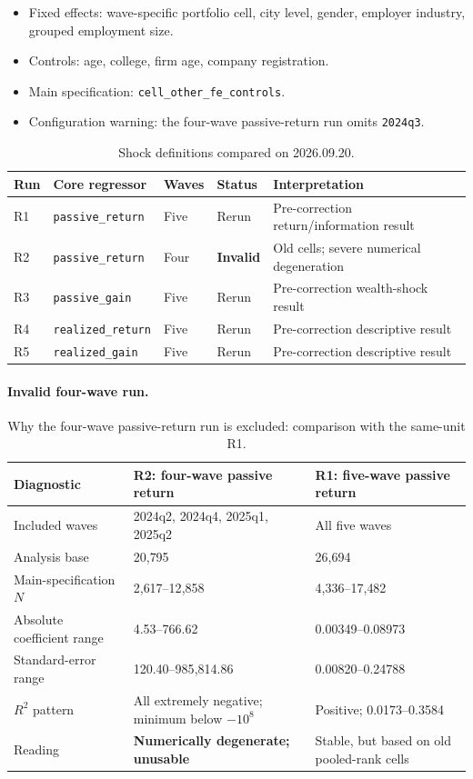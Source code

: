 \documentclass[11pt,letterpaper,english,final]{article}
\begin{document}
\begin{itemize}
\item Fixed effects: wave-specific portfolio cell, city level, gender, employer industry, grouped employment size.
\item Controls: age, college, firm age, company registration.
\item Main specification: \texttt{cell\_other\_fe\_controls}.
\item Configuration warning: the four-wave passive-return run omits \texttt{2024q3}.
\end{itemize}

\begin{table}[H]
\centering
\small
\setlength{\tabcolsep}{4pt}
\caption{Shock definitions compared on 2026.09.20.}
\label{tab:shock_run_matrix_20260920}
\begin{tabularx}{\textwidth}{p{1.0cm}p{2.9cm}p{2.0cm}p{2.2cm}X}
\toprule
Run & Core regressor & Waves & Status & Interpretation \tabularnewline
\midrule
R1 & \texttt{passive\_return} & Five & Rerun & Pre-correction return/information result \tabularnewline
R2 & \texttt{passive\_return} & Four & \textbf{Invalid} & Old cells; severe numerical degeneration \tabularnewline
R3 & \texttt{passive\_gain} & Five & Rerun & Pre-correction wealth-shock result \tabularnewline
R4 & \texttt{realized\_return} & Five & Rerun & Pre-correction descriptive result \tabularnewline
R5 & \texttt{realized\_gain} & Five & Rerun & Pre-correction descriptive result \tabularnewline
\bottomrule
\end{tabularx}
\end{table}

\paragraph{Invalid four-wave run.}

\begin{table}[H]
\centering
\small
\setlength{\tabcolsep}{5pt}
\caption{Why the four-wave passive-return run is excluded: comparison with the same-unit R1.}
\label{tab:r2_r3_diagnostic_comparison_20260920}
\begin{tabularx}{\textwidth}{p{4.0cm}XX}
\toprule
Diagnostic & R2: four-wave passive return & R1: five-wave passive return \\
\midrule
Included waves & 2024q2, 2024q4, 2025q1, 2025q2 & All five waves \\
Analysis base & 20{,}795 & 26{,}694 \\
Main-specification $N$ & 2{,}617--12{,}858 & 4{,}336--17{,}482 \\
Absolute coefficient range & 4.53--766.62 & 0.00349--0.08973 \\
Standard-error range & 120.40--985{,}814.86 & 0.00820--0.24788 \\
$R^2$ pattern & All extremely negative; minimum below $-10^8$ & Positive; 0.0173--0.3584 \\
Reading & \textbf{Numerically degenerate; unusable} & Stable, but based on old pooled-rank cells \\
\bottomrule
\end{tabularx}
\end{table}
\end{document}
